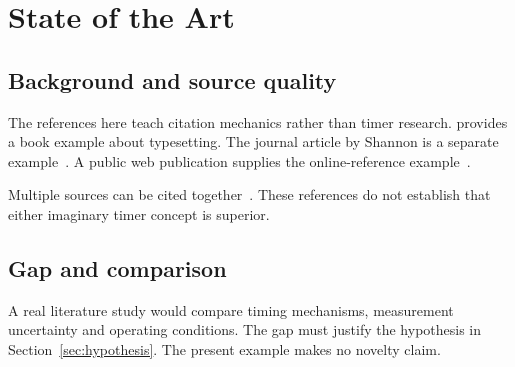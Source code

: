 \chapter{State of the Art}
\label{chap:state_of_the_art}

\section{Background and source quality}
\label{sec:literature}
The references here teach citation mechanics rather than timer research.
\textcite{knuth1984} provides a book example about typesetting.
The journal article by Shannon is a separate example~\cite{shannon1948}.
A public web publication supplies the online-reference example~\parencite{web1991}.

Multiple sources can be cited together~\cite{knuth1984,shannon1948}.
These references do not establish that either imaginary timer concept is superior.

\section{Gap and comparison}
A real literature study would compare timing mechanisms, measurement uncertainty
and operating conditions. The gap must justify the hypothesis in
Section~\ref{sec:hypothesis}. The present example makes no novelty claim.

